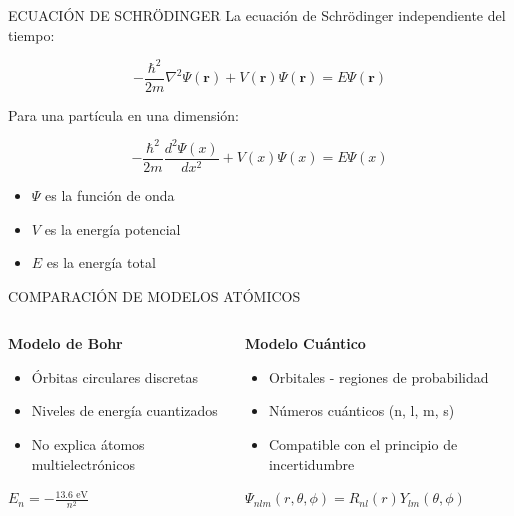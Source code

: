 \documentclass[aspectratio=169]{beamer} %
\begin{document}
	\begin{frame}{ECUACIÓN DE SCHRÖDINGER}
		La ecuación de Schrödinger independiente del tiempo:
		
		\begin{equation}
			-\frac{\hbar^2}{2m}\nabla^2\Psi(\mathbf{r}) + V(\mathbf{r})\Psi(\mathbf{r}) = E\Psi(\mathbf{r})
		\end{equation}
		
		Para una partícula en una dimensión:
		
		\begin{equation}
			-\frac{\hbar^2}{2m}\frac{d^2\Psi(x)}{dx^2} + V(x)\Psi(x) = E\Psi(x)
		\end{equation}
		
		\begin{itemize}
			\item $\Psi$ es la función de onda
			\item $V$ es la energía potencial
			\item $E$ es la energía total
		\end{itemize}
	\end{frame}
	
	\begin{frame}{COMPARACIÓN DE MODELOS ATÓMICOS}
		\begin{columns}
			\begin{column}{0.48\textwidth}
				\textbf{Modelo de Bohr}
				\begin{itemize}
					\item Órbitas circulares discretas
					\item Niveles de energía cuantizados
					\item No explica átomos multielectrónicos
				\end{itemize}
				\vspace{0.5cm}
				\centering
				$E_n = -\frac{13.6\text{ eV}}{n^2}$
			\end{column}
			
			\begin{column}{0.48\textwidth}
				\textbf{Modelo Cuántico}
				\begin{itemize}
					\item Orbitales - regiones de probabilidad
					\item Números cuánticos (n, l, m, s)
					\item Compatible con el principio de incertidumbre
				\end{itemize}
				\vspace{0.5cm}
				\centering
				$\Psi_{nlm}(r,\theta,\phi) = R_{nl}(r)Y_{lm}(\theta,\phi)$
			\end{column}
		\end{columns}
	\end{frame}
	
\end{document}
